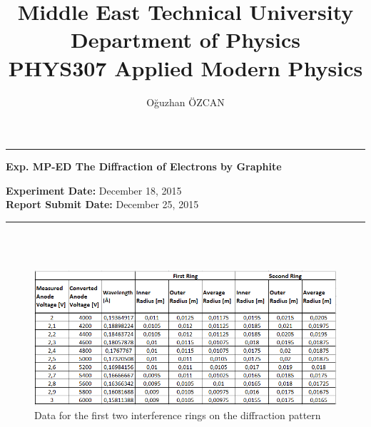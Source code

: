 \documentclass[a4paper,12pt]{article}
\title{Middle East Technical University\\Department of Physics\\\textbf{PHYS307 Applied Modern Physics}}
\author{Oğuzhan ÖZCAN\\}
\date{}
\providecommand{\expdate}[1]{\textbf{Experiment Date:} }
\providecommand{\repdate}[1]{\textbf{Report Submit Date:} }
\providecommand{\expname}[1]{\textbf{Exp. MP-ED The Diffraction of Electrons by Graphite} }
\begin{document}
\maketitle

\thispagestyle{fancy}

\noindent\rule{18.4cm}{0.8pt}
\begin{center}
	\expname{arg1}{}
\end{center}

\expdate{November 6, 2015}{December 18, 2015}\\
\repdate{arg1}{December 25, 2015}\\
\noindent\rule{18.4cm}{0.8pt}\\\\
\begin{figure}[h!]
\centering
\includegraphics[scale = 0.9]{"table 1"}
\caption{Data for the first two interference rings on the diffraction pattern}
\label{fig:table1}
\end{figure}
\end{document}
